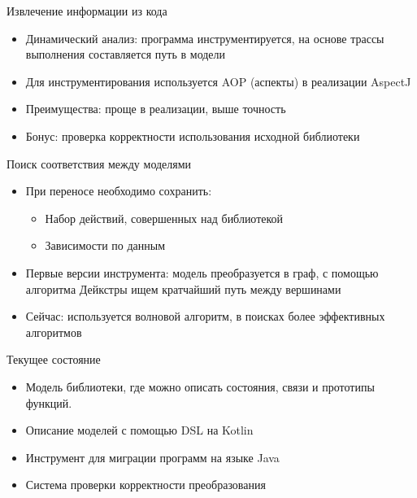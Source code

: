 \documentclass[12pt]{beamer}
\begin{document}
\begin{frame}[fragile]{Извлечение информации из кода}
	\begin{mybox}[]
		\begin{itemize}
			\item Динамический анализ: программа инструментируется, на основе трассы выполнения составляется путь в модели
			\item Для инструментирования используется AOP (аспекты) в реализации AspectJ
			\item Преимущества: проще в реализации, выше точность
			\item Бонус: проверка корректности использования исходной библиотеки
		\end{itemize}
	\end{mybox}
\end{frame}


\begin{frame}[fragile]{Поиск соответствия между моделями}
  \begin{mybox}[]
  \begin{itemize}
  	\item При переносе необходимо сохранить:
  	  \begin{itemize}
  	  	\item Набор действий, совершенных над библиотекой
  	  	\item Зависимости по данным
  	  \end{itemize}
  	\item Первые версии инструмента: модель преобразуется в граф, с помощью алгоритма Дейкстры ищем кратчайший путь между вершинами
  	\item Сейчас: используется волновой алгоритм, в поисках более эффективных алгоритмов
  \end{itemize}
  \end{mybox}
\end{frame}

\begin{frame}[fragile]{Текущее состояние}
  \begin{mybox}[]
  \begin{itemize}
  	\item Модель библиотеки, где можно описать состояния, связи и прототипы функций.
  	\item Описание моделей с помощью DSL на Kotlin
  	\item Инструмент для миграции программ на языке Java
  	\item Система проверки корректности преобразования
  \end{itemize}
  \end{mybox}
\end{frame}
\end{document}
